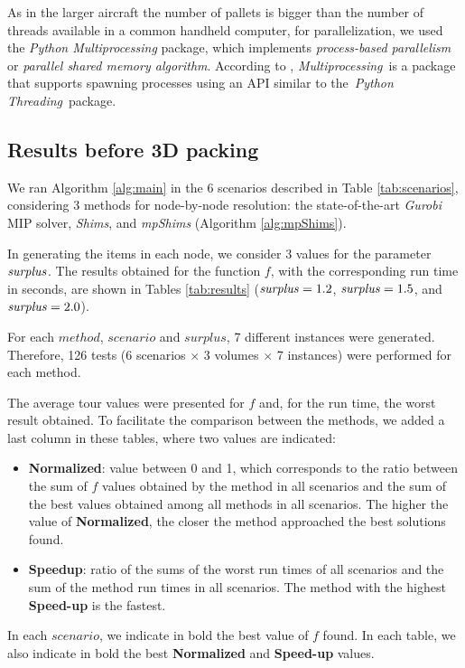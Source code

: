 \documentclass[preprint,authoryear]{elsarticle}
\begin{document}
As in the larger aircraft the number of pallets is bigger than the number of threads available in a common handheld computer, for parallelization, we used the {\it Python Multiprocessing} package, which implements {\it process-based parallelism} or {\it parallel shared memory algorithm}. According to \cite{multiprocessing}, {\it Multiprocessing} is a package that supports spawning processes using an API similar to the {\it Python Threading} package.


\subsection{Results {\bf before} 3D packing}

We ran Algorithm \ref{alg:main} in the 6 scenarios described in Table \ref{tab:scenarios}, considering 3 methods for node-by-node resolution: the state-of-the-art {\it Gurobi} MIP solver, {\it Shims}, and {\it mpShims} (Algorithm \ref{alg:mpShims}).

In generating the items in each node, we consider 3 values for the parameter ${\it surplus}$. The results obtained for the function $f$, with the corresponding run time in seconds, are shown in Tables \ref{tab:results} (${\it surplus} = 1.2$, ${\it surplus} = 1.5$, and ${\it surplus} = 2.0$).

For each $method$, $scenario$ and $surplus$, 7 different instances were generated. Therefore, 126 tests (6 scenarios $\times$ 3 volumes $\times$ 7 instances) were performed for each method. 

The average tour values were presented for $f$ and, for the run time, the worst result obtained. To facilitate the comparison between the methods, we added a last column in these tables, where two values are indicated:
\begin{itemize}
	\item {\bf Normalized}: value between 0 and 1, which corresponds to the ratio between the sum of $f$\/ values obtained by the method in all scenarios and the sum of the best values obtained among all methods in all scenarios. The higher the value of {\bf Normalized}, the closer the method approached the best solutions found.
	\item {\bf Speedup}: ratio of the sums of the worst run times of all scenarios and the sum of the method run times in all scenarios. The method with the highest {\bf Speed-up}\/ is the fastest.
\end{itemize}

In each $scenario$, we indicate in bold the best value of $f$\/ found. In each table, we also indicate in bold the best {\bf Normalized}\/ and {\bf Speed-up}\/ values.
\end{document}

